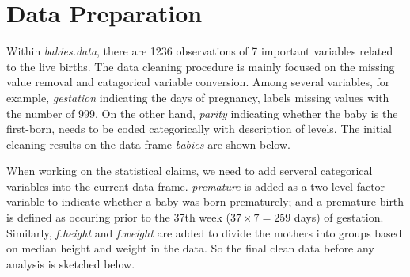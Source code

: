 \documentclass{article}
\begin{document}
\section*{Data Preparation}

\hspace{12 pt} Within \textit{babies.data}, there are 1236 observations of 7 
important variables related to the live births.
The data cleaning procedure is mainly focused on the missing value
removal and catagorical variable conversion. 
Among several variables, for example, \textit{gestation} indicating the days
of pregnancy, labels missing values with the number of 999. On the other hand,
\textit{parity} indicating whether the baby is the first-born, needs
to be coded categorically with description of levels. 
The initial cleaning results on the data frame \textit{babies} are
shown below.



When working on the statistical claims, we need to add serveral categorical
variables into the current data frame.
\textit{premature} is added as a two-level factor variable to indicate
whether a baby was born prematurely; and a premature birth is defined
as occuring prior to the 37th week ($37\times 7 = 259$ days) of
gestation. Similarly, \textit{f.height} and \textit{f.weight} are
added to divide the mothers into groups based on median height and
weight in the data. So the final clean data before any analysis is
sketched below.


\end{document}
